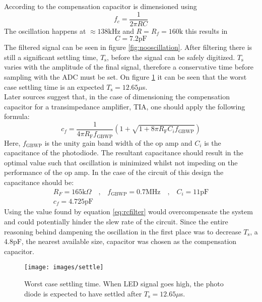 According to \cite{mec} the compensation capacitor is dimensioned using
\begin{equation}
	\label{eq:rcfilter}
	f_c=\frac{1}{2\pi R C}
\end{equation}
The oscillation happens at $\approx 138\text{kHz}$ and $R = R_f = 160\text{k}$ this results in 
$$C = 7.2\text{pF}$$ 
The filtered signal can be seen in figure \ref{fig:nooscillation}. After filtering there is still a significant settling time, $T_{\text{s}}$, before the signal can be safely digitized. $T_{\text{s}}$ varies with the amplitude of the final signal, therefore a conservative time before sampling with the ADC must be set. 
On figure \ref{fig:settletime} it can be seen that the worst case settling time is an expected $T_{\text{s}}=12.65\mu$s.
\\
Later sources \cite{maxim} suggest that, in the case of dimensioning the compensation capacitor for a transimpedance amplifier, TIA, one should apply the following formula:
\begin{equation}
	c_f=\frac{1}{4\pi R_\text{F}f_\text{GBWP}}(1+\sqrt{1+8\pi R_\text{F}C_if_\text{GBWP}})
\end{equation}
Here, $f_\text{GBWP}$ is the unity gain band width of the op amp and $C_i$ is the capacitance of the photodiode. 
The resultant capacitance should result in the optimal value such that oscillation is minimized whilst not impeding on the performance of the op amp. In the case of the circuit of this design the capacitance should be:
\begin{gather}
	R_F = 165\text{k}\Omega \quad \text{,} \quad f_\text{GBWP}=0.7\text{MHz} \quad \text{,} \quad C_i=11\text{pF}\\
	c_f = 4.725 \text{pF}
\end{gather}
Using the value found by equation \ref{eq:rcfilter} would overcompensate the system and could potentially hinder the slew rate of the circuit. Since the entire reasoning behind dampening the oscillation in the first place was to decrease $T_\text{s}$, a 4.8pF, the nearest available size, capacitor was chosen as the compensation capacitor.  
\begin{figure}[h!]
	\texttt{[image: images/settle]}
	\caption{Worst case settling time. When LED signal goes high, the photo diode is expected to have settled after $T_{\text{s}}=12.65\mu$s.}
	\label{fig:settletime}
\end{figure}